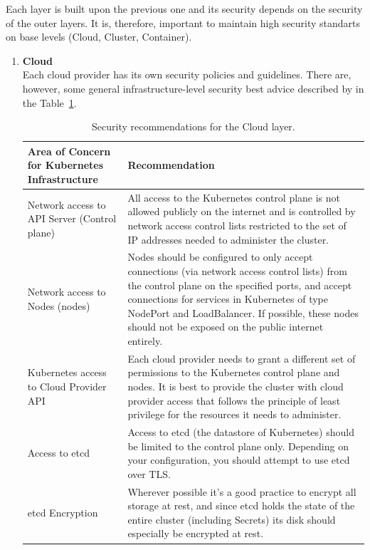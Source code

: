 Each layer is built upon the previous one and its security depends on the security of the outer layers. It is, therefore, important to maintain high security standarts on base levels (Cloud, Cluster, Container).

\begin{enumerate}

\item \textbf{Cloud} \\
Each cloud provider has its own security policies and guidelines. There are, however, some general infrastructure-level security best advice described by in the Table~\ref{tab:cloud-security-recommendations}.

\begin{table}[H]
    \begin{center}
        \begin{tabular}{ | p{} | p{} | } 
         \hline
         \textbf{Area of Concern for Kubernetes Infrastructure} & \textbf{Recommendation} \\ 
         \hline
         Network access to API Server (Control plane) & All access to the Kubernetes control plane is not allowed publicly on the internet and is controlled by network access control lists restricted to the set of IP addresses needed to administer the cluster. \\ 
         \hline
         Network access to Nodes (nodes)  & Nodes should be configured to only accept connections (via network access control lists) from the control plane on the specified ports, and accept connections for services in Kubernetes of type NodePort and LoadBalancer. If possible, these nodes should not be exposed on the public internet entirely. \\ 
         \hline
         Kubernetes access to Cloud Provider API & Each cloud provider needs to grant a different set of permissions to the Kubernetes control plane and nodes. It is best to provide the cluster with cloud provider access that follows the principle of least privilege for the resources it needs to administer. \\
         \hline
         Access to etcd & Access to etcd (the datastore of Kubernetes) should be limited to the control plane only. Depending on your configuration, you should attempt to use etcd over TLS. \\
         \hline
         etcd Encryption & Wherever possible it's a good practice to encrypt all storage at rest, and since etcd holds the state of the entire cluster (including Secrets) its disk should especially be encrypted at rest. \\
         \hline
        \end{tabular}
    \end{center}
    \caption{Security recommendations for the Cloud layer.}
    \label{tab:cloud-security-recommendations}
\end{table}


\end{enumerate}
